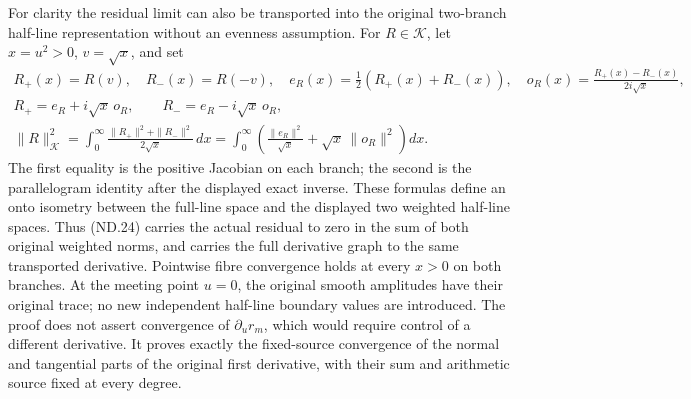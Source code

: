 For clarity the residual limit can also be transported into the original
two-branch half-line representation without an evenness assumption.
For \(R\in\mathscr K\), let \(x=u^2>0\), \(v=\sqrt x\), and set
\[
 \begin{gathered}
 R_+(x)=R(v),\quad R_-(x)=R(-v),\quad
 e_R(x)=\tfrac12(R_+(x)+R_-(x)),\quad
 o_R(x)=\frac{R_+(x)-R_-(x)}{2i\sqrt x},\\
 R_+=e_R+i\sqrt x\,o_R,\qquad R_-=e_R-i\sqrt x\,o_R,\\
 \|R\|_{\mathscr K}^2
 =\int_0^\infty\frac{\|R_+\|^2+\|R_-\|^2}{2\sqrt x}\,dx
 =\int_0^\infty\left(\frac{\|e_R\|^2}{\sqrt x}
                        +\sqrt x\,\|o_R\|^2\right)dx.
 \end{gathered}
 \tag{ND.34}
\]
The first equality is the positive Jacobian on each branch; the second
is the parallelogram identity after the displayed exact inverse.
These formulas define an onto isometry between the full-line space
and the displayed two weighted half-line spaces. Thus (ND.24) carries
the actual residual to zero in the sum of both original weighted
norms, and carries the full derivative graph to the same transported
derivative. Pointwise fibre convergence holds at every \(x>0\) on
both branches. At the meeting point \(u=0\), the original smooth
amplitudes have their original trace; no new independent half-line
boundary values are introduced. The proof does not assert convergence
of \(\partial_u r_m\), which would require control of a different
derivative. It proves exactly the fixed-source convergence of the
normal and tangential parts of the original first derivative, with
their sum and arithmetic source fixed at every degree.
